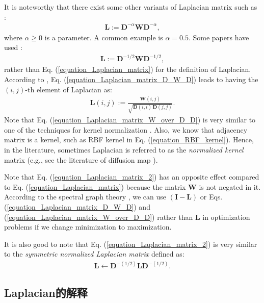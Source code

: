 \documentclass[lang=cn,10pt]{gorgeousnbook}
\numberwithin{equation}{section}%
\numberwithin{figure}{section}%
\begin{document}
It is noteworthy that there exist some other variants of Laplacian matrix such as \cite{weiss1999segmentation,ng2001spectral}:
\begin{align}\label{equation_Laplacian_matrix_2}
\boldsymbol{L} := \boldsymbol{D}^{-\alpha} \boldsymbol{W} \boldsymbol{D}^{-\alpha},
\end{align}
where $\alpha \geq 0$ is a parameter. A common example is $\alpha=0.5$. 
Some papers have used \cite{weiss1999segmentation,ng2001spectral}:
\begin{align}\label{equation_Laplacian_matrix_D_W_D}
\boldsymbol{L} := \boldsymbol{D}^{-1/2} \boldsymbol{W} \boldsymbol{D}^{-1/2},
\end{align}
rather than Eq. (\ref{equation_Laplacian_matrix}) for the definition of Laplacian.  
According to \cite{weiss1999segmentation}, Eq. (\ref{equation_Laplacian_matrix_D_W_D}) leads to having the $(i,j)$-th element of Laplacian as:
\begin{align}\label{equation_Laplacian_matrix_W_over_D_D}
\boldsymbol{L}(i,j) := \frac{\boldsymbol{W}(i,j)}{\sqrt{\boldsymbol{D}(i,i)\, \boldsymbol{D}(j,j)}}.
\end{align}
Note that Eq. (\ref{equation_Laplacian_matrix_W_over_D_D}) is very similar to one of the techniques for kernel normalization \cite{ah2010normalized}. Also, we know that adjacency matrix is a kernel, such as RBF kernel in Eq. (\ref{equation_RBF_kernel}). Hence, in the literature, sometimes Laplacian is referred to as the \textit{normalized kernel} matrix (e.g., see the literature of diffusion map \cite{coifman2006diffusion,nadler2006diffusion2}). 

Note that Eq. (\ref{equation_Laplacian_matrix_2}) has an opposite effect compared to Eq. (\ref{equation_Laplacian_matrix}) because the matrix $\boldsymbol{W}$ is not negated in it. 
According to the spectral graph theory \cite{chung1997spectral}, we can use $(\boldsymbol{I} - \boldsymbol{L})$ or Eqs. (\ref{equation_Laplacian_matrix_D_W_D}) and (\ref{equation_Laplacian_matrix_W_over_D_D}) rather than $\boldsymbol{L}$ in optimization problems if we change minimization to maximization.

It is also good to note that Eq. (\ref{equation_Laplacian_matrix_2}) is very similar to the \textit{symmetric normalized Laplacian matrix} defined as:
\begin{align}
\boldsymbol{L} \gets \boldsymbol{D}^{-(1/2)} \boldsymbol{L} \boldsymbol{D}^{-(1/2)}.
\end{align}

\subsection{Laplacian的解释}
\end{document}
